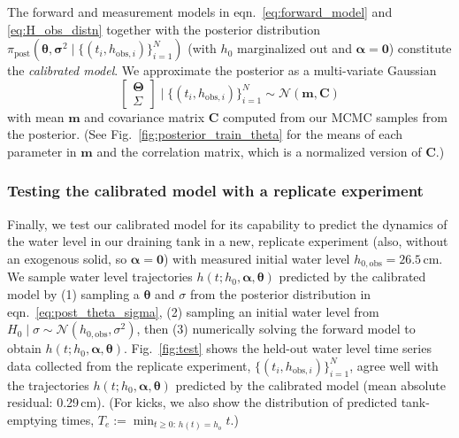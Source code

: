 \documentclass[a4paper,fleqn]{cas-dc}
\newcommand\thedata {$\{(t_i,h_{\text{obs}, i})\}_{i=1}^{N}$\xspace}
\newcommand\thedatanomath {\{(t_i,h_{\text{obs}, i})\}_{i=1}^{N}}
\newcommand\themodel {$h(t; h_0, \boldsymbol \alpha, \boldsymbol\theta)$\xspace}
\begin{document}
The forward and measurement models in eqn.~\ref{eq:forward_model} and \ref{eq:H_obs_distn} together with the posterior distribution $\pi_{\text{post}}(\boldsymbol \theta, \boldsymbol \sigma^2 \mid \thedatanomath)$ (with $h_0$ marginalized out and $\boldsymbol \alpha=\mathbf{0}$) constitute the \emph{calibrated model}.
We approximate the posterior as a multi-variate Gaussian
\begin{equation}
	\begin{bmatrix} \boldsymbol \Theta \\ \Sigma \end{bmatrix} \mid \thedatanomath \sim \mathcal{N}(\mathbf{m}, \mathbf{C}) \label{eq:post_theta_sigma}
\end{equation}
with mean $\mathbf{m}$ and covariance matrix $\mathbf{C}$ computed from our MCMC samples from the posterior. 
(See Fig.~\ref{fig:posterior_train_theta} for the means of each parameter in $\mathbf{m}$ and the correlation matrix, which is a normalized version of $\mathbf{C}$.)

\subsubsection{Testing the calibrated model with a replicate experiment}
Finally, we test our calibrated model for its capability to predict the dynamics of the water level in our draining tank in a new, replicate experiment (also, without an exogenous solid, so $\boldsymbol \alpha=\mathbf{0}$) with measured initial water level $h_{0, \text{obs}}=26.5$\,cm. 
We sample water level trajectories \themodel predicted by the calibrated model by (1) sampling a $\boldsymbol \theta$ and $\sigma$ from the posterior distribution in eqn.~\ref{eq:post_theta_sigma}, (2) sampling an initial water level from $H_0 \mid \sigma \sim \mathcal{N}(h_{0, \text{obs}}, \sigma^2)$, then (3) numerically solving the forward model to obtain \themodel.
Fig.~\ref{fig:test} shows the held-out water level time series data collected from the replicate experiment, \thedata, agree well with the trajectories \themodel predicted by the calibrated model (mean absolute residual: 0.29\,cm). 
(For kicks, we also show the distribution of predicted tank-emptying times, $T_e := \min_{t \geq 0 :\, h(t)=h_o} t$.)
\end{document}

